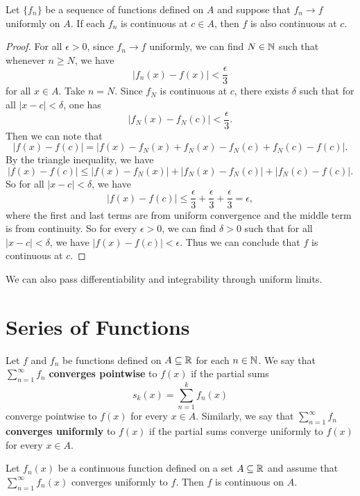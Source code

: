 \begin{theorem}
  Let $\{f_n\}$ be a sequence of functions defined
  on $A$ and suppose that $f_n \to f$ uniformly on $A$.
  If each $f_n$ is continuous at $c \in A$, then
  $f$ is also continuous at $c$.
\end{theorem}

\begin{proof}
  For all $\epsilon > 0$, since $f_n \to f$ uniformly,
  we can find $N \in \mathbb{N}$ such that whenever $n \ge N$,
  we have
  \[|f_n(x) - f(x)| < \frac{\epsilon}{3}\]
  for all $x \in A$. Take $n = N$. Since $f_N$ is continuous
  at $c$, there exists $\delta$ such that for all
  $|x - c| < \delta$, one has
  \[|f_N(x) - f_N(c)| < \frac{\epsilon}{3}.\]
  Then we can note that
  \[|f(x) - f(c)| = |f(x) - f_N(x) + f_N(x) - f_N(c) + f_N(c) - f(c)|.\]
  By the triangle inequality, we have
  \[|f(x) - f(c)| \le |f(x) - f_N(x)| + |f_N(x) - f_N(c)| + |f_N(c) - f(c)|.\]
  So for all $|x - c| < \delta$, we have
  \[|f(x) - f(c)| \le \frac{\epsilon}{3} + \frac{\epsilon}{3} + \frac{\epsilon}{3} = \epsilon,\]
  where the first and last terms are from uniform
  convergence and the middle term is from continuity.
  So for every $\epsilon > 0$, we can find $\delta > 0$
  such that for all $|x - c| < \delta$, we have
  $|f(x) - f(c)| < \epsilon$. Thus we can conclude that
  $f$ is continuous at $c$.
\end{proof}

\begin{remark}
  We can also pass differentiability and integrability
  through uniform limits.
\end{remark}

\section{Series of Functions}

\begin{definition}
  Let $f$ and $f_n$ be functions defined on $A \subseteq \mathbb{R}$
  for each $n \in \mathbb{N}$. We say that
  $\sum_{n = 1}^\infty f_n$ \textbf{converges pointwise}
  to $f(x)$ if the partial sums
  \[s_k(x) = \sum_{n = 1}^k f_n(x)\]
  converge pointwise to $f(x)$ for every $x \in A$.
  Similarly, we say that $\sum_{n = 1}^\infty f_n$
  \textbf{converges uniformly} to $f(x)$ if the partial sums
  converge uniformly to $f(x)$ for every $x \in A$.
\end{definition}

\begin{theorem}
  Let $f_n(x)$ be a continuous function defined on a set
  $A \subseteq \mathbb{R}$ and assume that
  $\sum_{n = 1}^\infty f_n(x)$ converges uniformly to
  $f$. Then $f$ is continuous on $A$.
\end{theorem}

